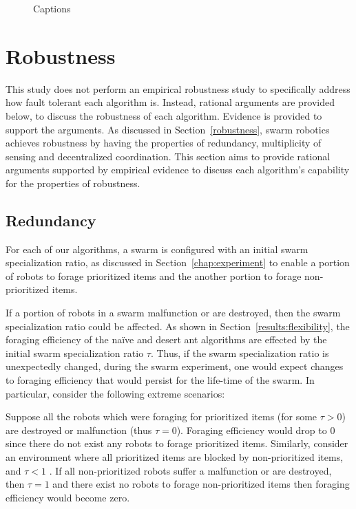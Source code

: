 \begin{figure}[!htb]
\centering
\resizebox{\textwidth}{!}{}
\caption{Captions}
\label{fig:problemscalability}
\end{figure}

\section{Robustness}
\label{results:robustness}
This study does not perform an empirical robustness study to specifically address how fault tolerant each algorithm is. Instead, rational arguments are provided below, to discuss the robustness of each algorithm. Evidence is provided to support the arguments. As discussed in Section~\ref{robustness}, swarm robotics achieves robustness by having the properties of redundancy, multiplicity of sensing and decentralized coordination. This section aims to provide rational arguments supported by empirical evidence to discuss each  algorithm's capability for the properties of robustness.

\subsection{Redundancy}
\label{results:redundancy}
For each of our algorithms, a swarm is configured with an initial swarm specialization ratio, as discussed in Section~\ref{chap:experiment} to enable a portion of robots to forage prioritized items and the another portion to forage non-prioritized items. 

If a portion of robots in a swarm malfunction or are destroyed, then the swarm specialization ratio could be affected. As shown in Section~\ref{results:flexibility}, the foraging efficiency of the na\"ive and desert ant algorithms are effected by the initial swarm specialization ratio $\tau$. Thus, if the swarm specialization ratio is unexpectedly changed, during the swarm experiment, one would expect changes to foraging efficiency that would persist for the life-time of the swarm. In particular, consider the following extreme scenarios: 

Suppose all the robots which were foraging for prioritized items (for some $\tau > 0$) are destroyed or malfunction (thus $\tau=0$). Foraging efficiency would drop to 0 since there do not exist any robots to forage prioritized items. Similarly, consider an environment where all prioritized items are blocked by non-prioritized items, and $\tau < 1$ . If all non-prioritized robots suffer a malfunction or are destroyed, then $\tau=1$ and there exist no robots to forage non-prioritized items then foraging efficiency would become zero. 

